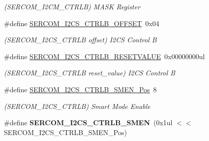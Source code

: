 \begin{DoxyCompactItemize}
\begin{DoxyCompactList}\small\item\em (S\+E\+R\+C\+O\+M\+\_\+\+I2\+C\+M\+\_\+\+C\+T\+R\+L\+B) M\+A\+S\+K Register \end{DoxyCompactList}\item 
\hypertarget{group___s_a_m_l21___s_e_r_c_o_m_gaab19d855585a8cefa26d3c18f23f5199}{}\#define \hyperlink{group___s_a_m_l21___s_e_r_c_o_m_gaab19d855585a8cefa26d3c18f23f5199}{S\+E\+R\+C\+O\+M\+\_\+\+I2\+C\+S\+\_\+\+C\+T\+R\+L\+B\+\_\+\+O\+F\+F\+S\+E\+T}~0x04\label{group___s_a_m_l21___s_e_r_c_o_m_gaab19d855585a8cefa26d3c18f23f5199}

\begin{DoxyCompactList}\small\item\em (S\+E\+R\+C\+O\+M\+\_\+\+I2\+C\+S\+\_\+\+C\+T\+R\+L\+B offset) I2\+C\+S Control B \end{DoxyCompactList}\item 
\hypertarget{group___s_a_m_l21___s_e_r_c_o_m_ga1cdf7723e2884d4309ae249c191f9672}{}\#define \hyperlink{group___s_a_m_l21___s_e_r_c_o_m_ga1cdf7723e2884d4309ae249c191f9672}{S\+E\+R\+C\+O\+M\+\_\+\+I2\+C\+S\+\_\+\+C\+T\+R\+L\+B\+\_\+\+R\+E\+S\+E\+T\+V\+A\+L\+U\+E}~0x00000000ul\label{group___s_a_m_l21___s_e_r_c_o_m_ga1cdf7723e2884d4309ae249c191f9672}

\begin{DoxyCompactList}\small\item\em (S\+E\+R\+C\+O\+M\+\_\+\+I2\+C\+S\+\_\+\+C\+T\+R\+L\+B reset\+\_\+value) I2\+C\+S Control B \end{DoxyCompactList}\item 
\hypertarget{group___s_a_m_l21___s_e_r_c_o_m_ga1f55640a403e336a6c62ee5b12212355}{}\#define \hyperlink{group___s_a_m_l21___s_e_r_c_o_m_ga1f55640a403e336a6c62ee5b12212355}{S\+E\+R\+C\+O\+M\+\_\+\+I2\+C\+S\+\_\+\+C\+T\+R\+L\+B\+\_\+\+S\+M\+E\+N\+\_\+\+Pos}~8\label{group___s_a_m_l21___s_e_r_c_o_m_ga1f55640a403e336a6c62ee5b12212355}

\begin{DoxyCompactList}\small\item\em (S\+E\+R\+C\+O\+M\+\_\+\+I2\+C\+S\+\_\+\+C\+T\+R\+L\+B) Smart Mode Enable \end{DoxyCompactList}\item 
\hypertarget{group___s_a_m_l21___s_e_r_c_o_m_ga863efdeb59ad93c1c572239e7ae43ae2}{}\#define {\bfseries S\+E\+R\+C\+O\+M\+\_\+\+I2\+C\+S\+\_\+\+C\+T\+R\+L\+B\+\_\+\+S\+M\+E\+N}~(0x1ul $<$$<$ S\+E\+R\+C\+O\+M\+\_\+\+I2\+C\+S\+\_\+\+C\+T\+R\+L\+B\+\_\+\+S\+M\+E\+N\+\_\+\+Pos)\label{group___s_a_m_l21___s_e_r_c_o_m_ga863efdeb59ad93c1c572239e7ae43ae2}


\end{DoxyCompactItemize}
